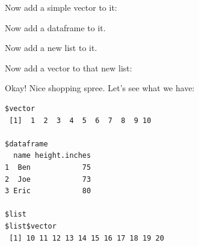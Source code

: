 \documentclass[
]{book}
\newenvironment{Shaded}{\begin{snugshade}}{\end{snugshade}}
\newcommand{\AttributeTok}[1]{\textcolor[rgb]{0.77,0.63,0.00}{#1}}
\newcommand{\DecValTok}[1]{\textcolor[rgb]{0.00,0.00,0.81}{#1}}
\newcommand{\FunctionTok}[1]{\textcolor[rgb]{0.00,0.00,0.00}{#1}}
\newcommand{\NormalTok}[1]{#1}
\newcommand{\OtherTok}[1]{\textcolor[rgb]{0.56,0.35,0.01}{#1}}
\newcommand{\SpecialCharTok}[1]{\textcolor[rgb]{0.00,0.00,0.00}{#1}}
\newcommand{\StringTok}[1]{\textcolor[rgb]{0.31,0.60,0.02}{#1}}
\begin{document}
Now add a simple vector to it:

\begin{Shaded}
\end{Shaded}

Now add a dataframe to it.

\begin{Shaded}
\end{Shaded}

Now add a new list to it.

\begin{Shaded}
\end{Shaded}

Now add a vector to that new list:

\begin{Shaded}
\end{Shaded}

Okay! Nice shopping spree. Let's see what we have:

\begin{verbatim}
$vector
 [1]  1  2  3  4  5  6  7  8  9 10

$dataframe
  name height.inches
1  Ben            75
2  Joe            73
3 Eric            80

$list
$list$vector
 [1] 10 11 12 13 14 15 16 17 18 19 20
\end{verbatim}
\end{document}
